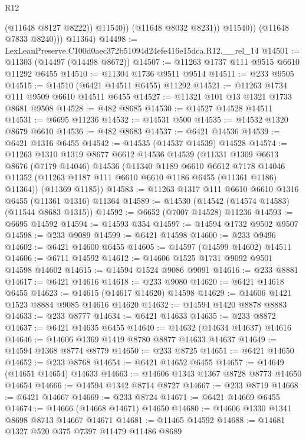 \begin{lexlean}{R12}
\begin{coremodule}
                      (@11648 @8127 @8222))
                    @11540))
                (@11648 @8032 @8231))
              @11540))
          (@11648 @7833 @8240)))
      @11364)
@14498 := LexLeanPreserve.C100d0aec372b51094d24efe416e15dca.R12.__rel_14
@14501 := @11303 (@14497 (@14498 @8672))
@14507 := @11263 @1737 @111 @9515 @6610 @11292 @6455
@14510 := @11304 @1736 @9511 @9514
@14511 := @233 @9505
@14515 := @14510 (@6421 @14511 @6455) @11292
@14521 := @11263 @1734 @111 @9509 @6610 @14511 @6455
@14527 := @11321 @101 @13 @1321 @1733 @8681 @9508
@14528 := @482 @8685
@14530 := @14527 @14528 @14511
@14531 := @6695 @11236
@14532 := @14531 @500
@14535 := @14532 @1320 @8679 @6610
@14536 := @482 @8683
@14537 := @6421 @14536
@14539 := @6421 @1316 @6455
@14542 := @14535 (@14537 @14539) @14528
@14574 := @11263
    @1310
    @1319
    @8677
    @6612
    @14536
    @14539
    (@11331
      @1309
      @6613
      @8676
      (@7179 @14046)
      @14536
      (@11340
        @1189
        @6610
        @6612
        @7178
        @14046
        @11352
        (@11263 @1187 @111 @6610 @6610 @1186 @6455 (@11361 @1186) @11364))
      (@11369 @1185))
@14583 := @11263 @1317 @111 @6610 @6610 @1316 @6455 (@11361 @1316) @11364
@14589 := @14530 (@14542 (@14574 @14583) (@11544 @8683 @1315))
@14592 := @6652 (@7007 @14528) @11236
@14593 := @6695 @14592
@14594 := @14593 @354
@14597 := @14594 @1732 @9502 @9507
@14598 := @233 @9089
@14599 := @6421 @14598
@14600 := @233 @9496
@14602 := @6421 @14600 @6455
@14605 := @14597 (@14599 @14602) @14511
@14606 := @6711 @14592
@14612 := @14606 @1525 @1731 @9092 @9501 @14598 @14602
@14615 := @14594 @1524 @9086 @9091
@14616 := @233 @8881
@14617 := @6421 @14616
@14618 := @233 @9080
@14620 := @6421 @14618 @6455
@14623 := @14615 (@14617 @14620) @14598
@14629 := @14606 @1421 @1523 @8884 @9085 @14616 @14620
@14632 := @14594 @1420 @8878 @8883
@14633 := @233 @8777
@14634 := @6421 @14633
@14635 := @233 @8872
@14637 := @6421 @14635 @6455
@14640 := @14632 (@14634 @14637) @14616
@14646 := @14606 @1369 @1419 @8780 @8877 @14633 @14637
@14649 := @14594 @1368 @8774 @8779
@14650 := @233 @8725
@14651 := @6421 @14650
@14652 := @233 @8768
@14654 := @6421 @14652 @6455
@14657 := @14649 (@14651 @14654) @14633
@14663 := @14606 @1343 @1367 @8728 @8773 @14650 @14654
@14666 := @14594 @1342 @8714 @8727
@14667 := @233 @8719
@14668 := @6421 @14667
@14669 := @233 @8724
@14671 := @6421 @14669 @6455
@14674 := @14666 (@14668 @14671) @14650
@14680 := @14606 @1330 @1341 @8698 @8713 @14667 @14671
@14681 := @11465 @14592
@14688 := @14681 @1327 @520 @375 @7397 @11479 @11486 @8689

\end{coremodule}
\end{lexlean}
